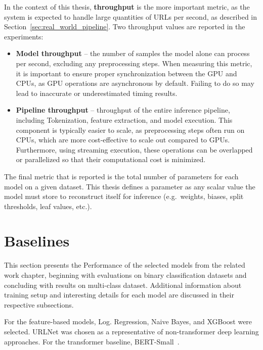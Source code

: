 In the context of this thesis, \textbf{throughput} is the more important metric, as the system is expected to handle large quantities of URLs per second, as described in Section~\ref{sec:real_world_pipeline}. Two throughput values are reported in the experiments:
\begin{itemize}
    \item \textbf{Model throughput} -- the number of samples the model alone can process per second, excluding any preprocessing steps. When measuring this metric, it is important to ensure proper synchronization between the GPU and CPUs, as GPU operations are asynchronous by default. Failing to do so may lead to inaccurate or underestimated timing results.
    \item \textbf{Pipeline throughput} -- throughput of the entire inference pipeline, including Tokenization, feature extraction, and model execution. This component is typically easier to scale, as preprocessing steps often run on CPUs, which are more cost-effective to scale out compared to GPUs. Furthermore, using streaming execution, these operations can be overlapped or parallelized so that their computational cost is minimized.
\end{itemize}

The final metric that is reported is the total number of parameters for each model on a given dataset. This thesis defines a parameter as any scalar value the model must store to reconstruct itself for inference (e.g.\ weights, biases, split thresholds, leaf values, etc.).

\section{Baselines}
\label{sec:baselines}
This section presents the Performance of the selected models from the related work chapter, beginning with evaluations on binary classification datasets and concluding with results on multi-class dataset. Additional information about training setup and interesting details for each model are discussed in their respective subsections.

For the feature-based models, Log. Regression, Naive Bayes, and XGBoost were selected. URLNet was chosen as a representative of non-transformer deep learning approaches. For the transformer baseline, BERT-Small~\cite{turc2019}.

